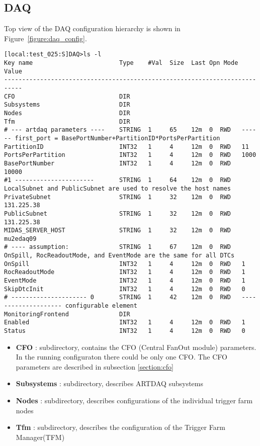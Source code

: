 \subsection{DAQ}
Top view of the DAQ configuration hierarchy is shown in Figure~\ref{figure:daq_config}.

{ \scriptsize
\begin{verbatim}
[local:test_025:S]DAQ>ls -l  
Key name                        Type    #Val  Size  Last Opn Mode Value
---------------------------------------------------------------------------
CFO                             DIR
Subsystems                      DIR
Nodes                           DIR
Tfm                             DIR
# --- artdaq parameters ----    STRING  1     65    12m  0  RWD   ------ first_port = BasePortNumber+PartitionID*PortsPerPartition
PartitionID                     INT32   1     4     12m  0  RWD   11
PortsPerPartition               INT32   1     4     12m  0  RWD   1000
BasePortNumber                  INT32   1     4     12m  0  RWD   10000
#1 ----------------------       STRING  1     64    12m  0  RWD   LocalSubnet and PublicSubnet are used to resolve the host names
PrivateSubnet                   STRING  1     32    12m  0  RWD   131.225.38
PublicSubnet                    STRING  1     32    12m  0  RWD    131.225.38
MIDAS_SERVER_HOST               STRING  1     32    12m  0  RWD   mu2edaq09
# ---- assumption:              STRING  1     67    12m  0  RWD   OnSpill, RocReadoutMode, and EventMode are the same for all DTCs
OnSpill                         INT32   1     4     12m  0  RWD   1
RocReadoutMode                  INT32   1     4     12m  0  RWD   1
EventMode                       INT32   1     4     12m  0  RWD   1
SkipDtcInit                     INT32   1     4     12m  0  RWD   0
# --------------------- 0       STRING  1     42    12m  0  RWD   -------------------- configurable element
MonitoringFrontend              DIR
Enabled                         INT32   1     4     12m  0  RWD   1
Status                          INT32   1     4     12m  0  RWD   0
\end{verbatim}

}

\begin{itemize}
\item
  {\bf CFO} : subdirectory, contains the CFO (Central FanOut module) parameters.
  In the running configuraton there could be only one CFO.
  The CFO parameters are described in subsection \ref{section:cfo}
\item
  {\bf Subsystems} : subdirectory, describes ARTDAQ subsystems
\item
  {\bf Nodes} : subdirectory, describes configurations of the individual trigger farm nodes
\item
  {\bf Tfm} : subdirectory, describes the configuration of the Trigger Farm Manager(TFM)
\end{itemize}


